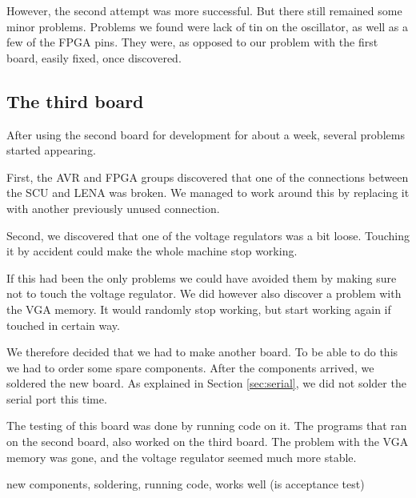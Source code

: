 However, the second attempt was more successful. But there still remained some
minor problems. Problems we found were lack of tin on the oscillator, as well as
a few of the \ac{FPGA} pins. They were, as opposed to our problem with the first
board, easily fixed, once discovered.

\subsection{The third board}
After using the second board for development for about a week, several problems started appearing.

First, the AVR and FPGA groups discovered that one of the connections between the SCU and LENA was broken. We managed to work around this by replacing it with another previously unused connection.

Second, we discovered that one of the voltage regulators was a bit loose. Touching it by accident could make the whole machine stop working.

If this had been the only problems we could have avoided them by making sure not to touch the voltage regulator. We did however also discover a problem with the VGA memory. It would randomly stop working, but start working again if touched in certain way.

We therefore decided that we had to make another board. To be able to do this we had to order some spare components. After the components arrived, we soldered the new board. As explained in Section \ref{sec:serial}, we did not solder the serial port this time.

The testing of this board was done by running code on it. The programs that ran on the second board, also worked on the third board. The problem with the VGA memory was gone, and the voltage regulator seemed much more stable.

new components, soldering, running code, works well (is acceptance test)
